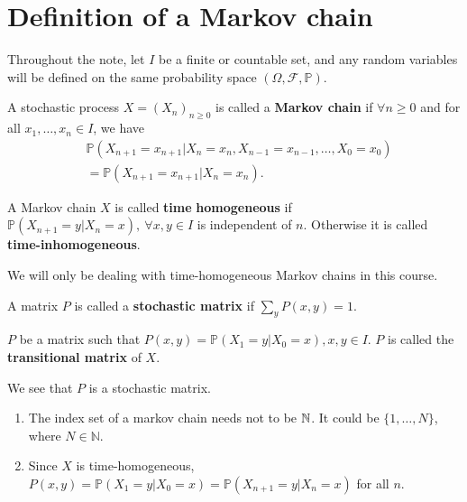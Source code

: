 \documentclass[a4paper,11pt]{article}
\begin{document}
\maketitle
\clearpage
\tableofcontents
\clearpage 

\section{Definition of a Markov chain}
Throughout the note, let $ I $ be a finite or countable set, and any random variables will be defined on the same probability space $ (\Omega, \mathcal{F}, \mathbb{P}) $.

\begin{definition}
    A stochastic process $ X=(X_n)_{n\ge 0} $ is called a \textbf{Markov chain} if $ \forall n\ge 0 $ and for all $ x_1,\dots,x_n\in I $, we have 
    \[
        \begin{aligned}
            &\mathbb{P}(X_{n+1}=x_{n+1}|X_n=x_n, X_{n-1}=x_{n-1}, \dots, X_0=x_0)\\ &= \mathbb{P}(X_{n+1}=x_{n+1}|X_n=x_n).
        \end{aligned}
    \]
\end{definition}
\begin{definition}
    A Markov chain $X$ is called \textbf{time} \textbf{homogeneous} if $ \mathbb{P}(X_{n+1}=y|X_n=x),\ \forall x,y\in I $ is independent of $n$. Otherwise it is called \textbf{time-inhomogeneous}.
\end{definition}
We will only be dealing with time-homogeneous Markov chains in this course.
\begin{definition}
    A matrix $P$ is called a \textbf{stochastic matrix} if $ \sum_{y}P(x,y)=1 $.
\end{definition}

\begin{definition}
    $P$ be a matrix such that $ P(x,y) = \mathbb{P}(X_1=y|X_0=x), x,y\in I $. $P$ is called the \textbf{transitional matrix} of $X$.
\end{definition}

We see that $P$ is a stochastic matrix.

\begin{remark}
    \begin{enumerate}
        \item The index set of a markov chain needs not to be ${\mathbb{N}}$. It could be $ \{1,\dots,N\} $, where $ N\in \mathbb{N} $.
        \item Since $X$ is time-homogeneous, $ P(x,y)=\mathbb{P}(X_1=y|X_0=x)=\mathbb{P}(X_{n+1}=y|X_n=x) $ for all $n$.
    \end{enumerate}
\end{remark}
\end{document}
